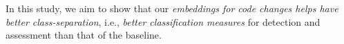 %





In this study, we aim to show that our {\em embeddings for code
changes helps {\tool} have better class-separation}, i.e., {\em better
classification measures} for detection and assessment than that of the baseline.


